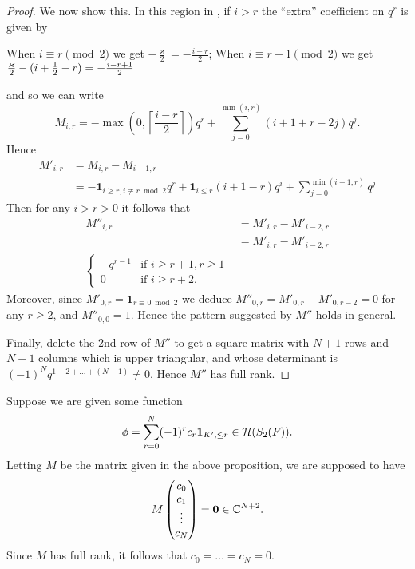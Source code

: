 \begin{proof}
  We now show this.
  In this region in , if $i > r$
  the ``extra'' coefficient on $q^r$ is given by
  \begin{itemize}
    \ii When $i \equiv r \pmod 2$ we get $-\frac{\varkappa}{2} = - \frac{i-r}{2}$;
    \ii When $i \equiv r+1 \pmod 2$ we get $\frac{\varkappa}{2} - (i + \frac{1}{2} - r) = -\frac{i-r+1}{2}$
  \end{itemize}
  and so we can write
  \[
    M_{i,r}
    = - \max\left(0, \left\lceil \frac{i-r}{2} \right\rceil \right) q^{r}
    + \sum_{j=0}^{\min(i,r)} \left( i + 1 + r - 2j \right) q^j.
  \]
  Hence
  \begin{align*}
    M'_{i,r}
    &= M_{i,r} - M_{i-1,r} \\
    &= - \mathbf{1}_{i \ge r, i \not\equiv r \bmod 2} q^r
    + \mathbf{1}_{i \le r} (i+1-r) q^i
    + \sum_{j=0}^{\min(i-1,r)} q^j
  \end{align*}
  Then for any $i > r > 0$ it follows that
  \begin{align*}
    M''_{i,r}
    &= M'_{i,r} - M'_{i-2,r} \\
    &= M'_{i,r} - M'_{i-2,r} \\
    \begin{cases}
      -q^{r-1} & \text{if } i \ge r+1, r \ge 1 \\
      0 & \text{if } i \ge r+2.
    \end{cases}
  \end{align*}
  Moreover, since $M'_{0,r} = \mathbf{1}_{r \equiv 0 \bmod 2}$
  we deduce
  $M''_{0,r} = M'_{0,r} - M'_{0,r-2} = 0$
  for any $r \ge 2$, and $M''_{0,0} = 1$.
  Hence the pattern suggested by $M''$ holds in general.

  Finally, delete the 2nd row of $M''$ to get a square matrix
  with $N+1$ rows and $N+1$ columns which is upper triangular,
  and whose determinant is $(-1)^N q^{1+2+\dots+(N-1)} \neq 0$.
  Hence $M''$ has full rank.
\end{proof}

Suppose we are given some function
\[ \phi = \sum_{r=0}^N (-1)^r c_r \mathbf{1}_{K', \le r} \in \mathcal H(S_2(F)). \]
Letting $M$ be the matrix given in the above proposition, we are supposed to have
\[
  M \begin{pmatrix} c_0 \\ c_1 \\ \vdots \\ c_N \end{pmatrix}
  = \mathbf{0} \in \mathbb C^{N+2}.
\]
Since $M$ has full rank, it follows that $c_0 = \dots = c_N = 0$.

